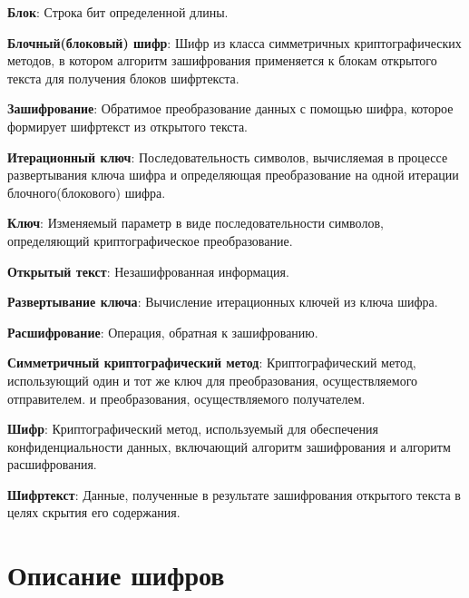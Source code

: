 \documentclass[colorthm]{../civarticle}
\begin{document}
\textbf{Блок}: Строка бит определенной длины.

\textbf{Блочный(блоковый) шифр}: Шифр из класса симметричных криптографических методов, в котором алгоритм зашифрования применяется к блокам открытого текста для получения блоков шифртекста.

\textbf{Зашифрование}: Обратимое преобразование данных с помощью шифра, которое формирует шифртекст из открытого текста.

\textbf{Итерационный ключ}: Последовательность символов, вычисляемая в процессе развертывания ключа шифра и определяющая преобразование на одной итерации блочного(блокового) шифра.

\textbf{Ключ}: Изменяемый параметр в виде последовательности символов, определяющий криптографическое преобразование.

\textbf{Открытый текст}: Незашифрованная информация.

\textbf{Развертывание ключа}: Вычисление итерационных ключей из ключа шифра.

\textbf{Расшифрование}: Операция, обратная к зашифрованию.

\textbf{Симметричный криптографический метод}: Криптографический метод, использующий один и тот же ключ для преобразования, осуществляемого отправителем. и преобразования, осуществляемого получателем.

\textbf{Шифр}: Криптографический метод, используемый для обеспечения конфиденциальности данных, включающий алгоритм зашифрования и алгоритм расшифрования.

\textbf{Шифртекст}: Данные, полученные в результате зашифрования открытого текста в целях скрытия его содержания.



\section{Описание шифров}
\end{document}
